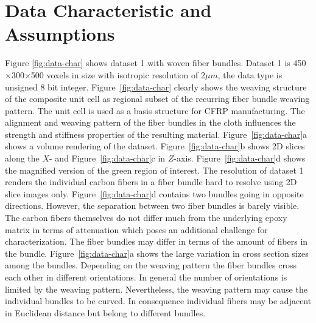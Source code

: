 \section {Data Characteristic and Assumptions}
\label{sec:char_data}
Figure \ref{fig:data-char} shows dataset 1 with woven fiber bundles. Dataset 1 is 450$\times$300$\times$500 voxels in size with isotropic resolution of 2$\mu m$, the data type is unsigned 8 bit integer. Figure~\ref{fig:data-char} clearly shows the weaving structure of the composite unit cell as regional subset of the recurring fiber bundle weaving pattern. The unit cell is used as a basis structure for CFRP manufacturing. The alignment and weaving pattern of the fiber bundles in the cloth influences the strength and stiffness properties of the resulting material. Figure~\ref{fig:data-char}a shows a volume rendering of the dataset. Figure~\ref{fig:data-char}b shows 2D slices along the $X$- and Figure~\ref{fig:data-char}c in $Z$-axis. Figure~\ref{fig:data-char}d shows the magnified version of the green region of interest. 
The resolution of dataset 1 renders the individual carbon fibers in a fiber bundle hard to resolve using 2D slice images only. Figure~\ref{fig:data-char}d contains two bundles going in opposite directions. However, the separation between two fiber bundles is barely visible. The carbon fibers themselves do not differ much from the underlying epoxy matrix in terms of attenuation which poses an additional challenge for characterization. The fiber bundles may differ in terms of the amount of fibers in the bundle. Figure~\ref{fig:data-char}a shows the large variation in cross section sizes among the bundles.
Depending on the weaving pattern the fiber bundles cross each other in different orientations. In general the number of orientations is limited by the weaving pattern. Nevertheless, the weaving pattern may cause the individual bundles to be curved. In consequence individual fibers may be adjacent in Euclidean distance but belong to different bundles. 

